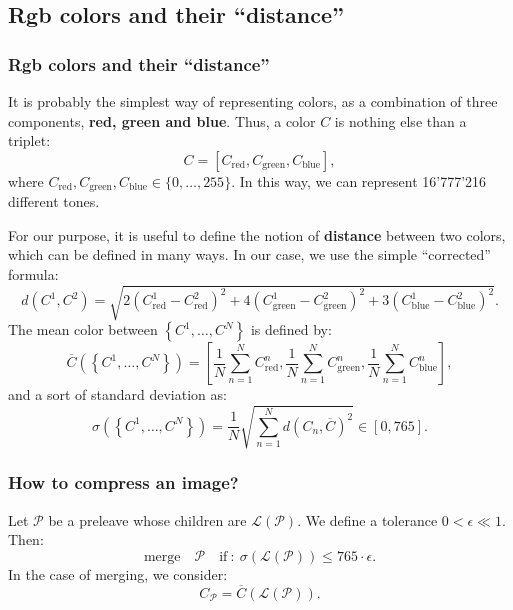\documentclass[8pt]{beamer}
\begin{document}
\subsection{Rgb colors and their ``distance''}
\begin{frame}
 \frametitle{Rgb colors and their ``distance''}
 It is probably the simplest way of representing colors, as a combination of three components, \textbf{red, green and blue}.
 Thus, a color $C$ is nothing else than a triplet:
 \begin{equation*}
  C = \left [ C_{\text{red}}, C_{\text{green}}, C_{\text{blue}}\right ],
 \end{equation*}
where $C_{\text{red}},C_{\text{green}},C_{\text{blue}} \in \{0,\dots, 255 \}$. In this way, we can represent 16'777'216 different tones.
 
 For our purpose, it is useful to define the notion of \textbf{distance} between two colors, which can be defined in many ways. In our case, we use the simple ``corrected'' formula:
 \begin{equation*}
  d(C^1,C^2) = \sqrt{2 \left (C^1_{\text{red}}-C^2_{\text{red}} \right )^2 + 4 \left (C^1_{\text{green}}-C^2_{\text{green}} \right )^2 + 3 \left (C^1_{\text{blue}}-C^2_{\text{blue}} \right )^2}.
 \end{equation*}
The mean color between $\left \{ C^1, \dots, C^N\right \} $ is defined by:
\begin{equation*}
 \overline{C} \left ( \left \{ C^1, \dots, C^N\right \} \right ) = \left[ \frac{1}{N} \sum_{n=1}^N C_{\text{red}}^n, \frac{1}{N} \sum_{n=1}^N C_{\text{green}}^n, \frac{1}{N} \sum_{n=1}^N C_{\text{blue}}^n\right ],
\end{equation*}
and a sort of standard deviation as:
\begin{equation*}
 \sigma  \left ( \left \{ C^1, \dots, C^N\right \} \right ) = \frac{1}{N} \sqrt{\sum_{n=1}^N d(C_n,\overline{C})^2} \in [0,765].
\end{equation*}
\end{frame}

\begin{frame}
 \frametitle{How to compress an image?}
 Let $\mathcal{P}$ be a preleave whose children are $\mathcal{L}(\mathcal{P})$. We define a tolerance $0< \epsilon \ll 1$. Then:
 \begin{equation*}
  \text{merge} \quad \mathcal{P} \quad \text{if} ~ : ~ \sigma  \left ( \mathcal{L}(\mathcal{P}) \right ) \leq 765 \cdot \epsilon.
 \end{equation*}
In the case of merging, we consider:
\begin{equation*}
 C_{\mathcal{P}} = \overline{C} \left ( \mathcal{L}(\mathcal{P}) \right ).
\end{equation*}

\end{frame}
\end{document}
